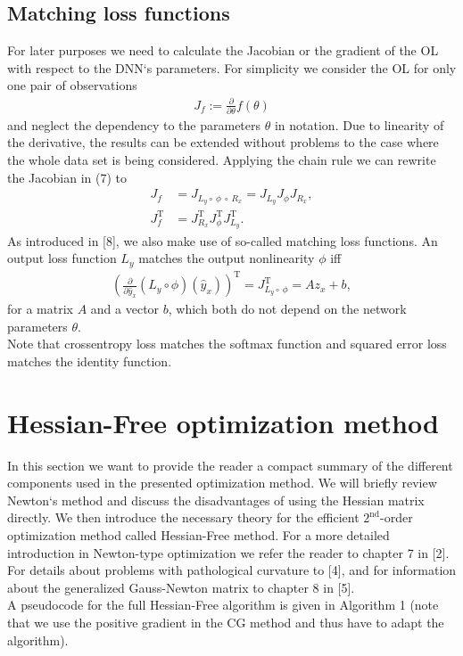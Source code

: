 \documentclass[conference]{IEEEtran}
\begin{document}
	\subsection{Matching loss functions}
	\noindent
	For later purposes we need to calculate the Jacobian or the gradient of the OL with respect to the DNN`s parameters. For simplicity we consider the OL for only one pair of observations
	\begin{align}
	J_{f} := \frac{\partial}{\partial\theta}f(\theta)
	\end{align}
	and neglect the dependency to the parameters $\theta$ in notation.
	Due to linearity of the derivative, the results can be extended without problems to the case where the whole data set is being considered.
	Applying the chain rule we can rewrite the Jacobian in (7) to
	\begin{align}
	J_{f} &= J_{L_{y}\circ \:\phi \:\circ\:R_{x}} = J_{L_{y}} J_{\phi} J_{R_{x}},\\
	J_{f}^{\mathrm{T}} &= J_{R_{x}}^{\mathrm{T}}  J_{\phi}^{\mathrm{T}}  J_{L_{y}}^{\mathrm{T}}.
	\end{align}
	As introduced in [8], we also make use of so-called matching loss functions. An output loss function $L_{y}$ matches the output nonlinearity $\phi$ iff
	\begin{align}
	\left(\frac{\partial}{\partial\hat{y}_{x}}\left(L_{y}\circ \phi\right)(\hat{y}_{x})\right)^{\mathrm{T}}= J_{L_{y}\circ \:\phi}^{\mathrm{T}} = A z_{x} + b,
	\end{align}
	for a matrix $A$ and a vector $b$, which both do not depend on the network parameters $\theta$.\\
	Note that crossentropy loss matches the softmax function and squared error loss matches the identity function.
	
	
	\section{Hessian-Free optimization method}
	\noindent
	In this section we want to provide the reader a compact summary of the different components used in the presented optimization method. We will briefly review Newton`s method and discuss the disadvantages of using the Hessian matrix directly. We then introduce the necessary theory for the efficient $2^{\text{nd}}$-order optimization method called Hessian-Free method. For a more detailed introduction in Newton-type optimization we refer the reader to chapter 7 in [2]. For details about problems with pathological curvature to [4], and for information about the generalized Gauss-Newton matrix to chapter 8 in [5].\\
	A pseudocode for the full Hessian-Free algorithm is given in Algorithm 1 (note that we use the positive gradient in the CG method and thus have to adapt the algorithm).
	
\end{document}
